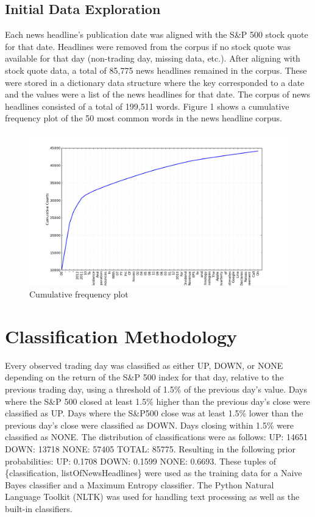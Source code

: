 \documentclass[]{article}
\begin{document}
\subsection{Initial Data Exploration}
Each news headline's publication date was aligned with the S\&P 500 stock quote for that date.  Headlines were removed from the corpus if no stock quote was available for that day (non-trading day, missing data, etc.). After aligning with stock quote data, a total of 85,775 news headlines remained in the corpus.  These were stored in a dictionary data structure where the key corresponded to a date and the values were a list of the news headlines for that date.  The corpus of news headlines consisted of a total of 199,511 words.  Figure 1 shows a cumulative frequency plot of the 50 most common words in the news headline corpus.
\begin{figure}
\centering
\includegraphics[scale=0.25]{cum_graph.png}
\caption{Cumulative frequency plot}
\end{figure}
\section{Classification Methodology}
Every observed trading day was classified as either UP, DOWN, or NONE depending on the return of the S\&P 500 index for that day, relative to the previous trading day, using a threshold of 1.5\% of the previous day's value.  Days where the S\&P 500 closed at least 1.5\%  higher than the previous day's close were classified as UP.  Days where the S\&P500 close was at least 1.5\% lower than the previous day's close were classified as DOWN.  Days closing within 1.5\% were classified as NONE.  The distribution of classifications were as follows:
UP: 14651
DOWN: 13718
NONE: 57405
TOTAL: 85775.
Resulting in the following prior probabilities: 
UP: 0.1708
DOWN: 0.1599
NONE:  0.6693.
These tuples of  \{classification, listOfNewsHeadlines\} were used as the training data for a Naive Bayes classifier and a Maximum Entropy classifier.  The Python Natural Language Toolkit (NLTK) was used for handling text processing as well as the built-in classifiers. 
\end{document}
